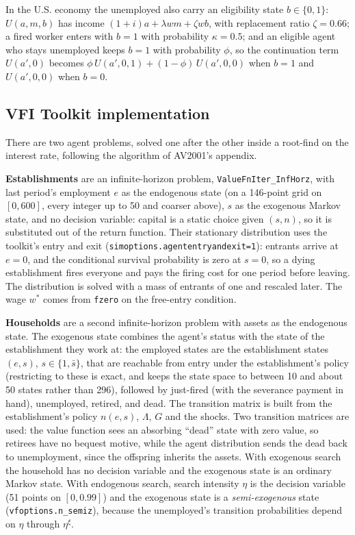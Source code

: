 \documentclass[11pt,fleqn]{article}
\begin{document}
In the U.S. economy the unemployed also carry an eligibility state $b\in\{0,1\}$: $U(a,m,b)$ has income $(1+i)a+\lambda w m+\zeta w b$, with replacement ratio $\zeta=0.66$; a fired worker enters with $b=1$ with probability $\kappa=0.5$; and an eligible agent who stays unemployed keeps $b=1$ with probability $\phi$, so the continuation term $U(a',0)$ becomes $\phi\,U(a',0,1)+(1-\phi)\,U(a',0,0)$ when $b=1$ and $U(a',0,0)$ when $b=0$.


\subsection{VFI Toolkit implementation}

There are two agent problems, solved one after the other inside a root-find on the interest rate, following the algorithm of AV2001's appendix.

\textbf{Establishments} are an infinite-horizon problem, \verb|ValueFnIter_InfHorz|, with last period's employment $e$ as the endogenous state (on a 146-point grid on $[0,600]$, every integer up to 50 and coarser above), $s$ as the exogenous Markov state, and no decision variable: capital is a static choice given $(s,n)$, so it is substituted out of the return function. Their stationary distribution uses the toolkit's entry and exit (\verb|simoptions.agententryandexit=1|): entrants arrive at $e=0$, and the conditional survival probability is zero at $s=0$, so a dying establishment fires everyone and pays the firing cost for one period before leaving. The distribution is solved with a mass of entrants of one and rescaled later. The wage $w^*$ comes from \verb|fzero| on the free-entry condition.

\textbf{Households} are a second infinite-horizon problem with assets as the endogenous state. The exogenous state combines the agent's status with the state of the establishment they work at: the employed states are the establishment states $(e,s)$, $s\in\{1,\bar{s}\}$, that are reachable from entry under the establishment's policy (restricting to these is exact, and keeps the state space to between 10 and about 50 states rather than 296), followed by just-fired (with the severance payment in hand), unemployed, retired, and dead. The transition matrix is built from the establishment's policy $n(e,s)$, $\Lambda$, $G$ and the shocks. Two transition matrices are used: the value function sees an absorbing ``dead'' state with zero value, so retirees have no bequest motive, while the agent distribution sends the dead back to unemployment, since the offspring inherits the assets. With exogenous search the household has no decision variable and the exogenous state is an ordinary Markov state. With endogenous search, search intensity $\eta$ is the decision variable (51 points on $[0,0.99]$) and the exogenous state is a \emph{semi-exogenous} state (\verb|vfoptions.n_semiz|), because the unemployed's transition probabilities depend on $\eta$ through $\eta^\xi$.
\end{document}
